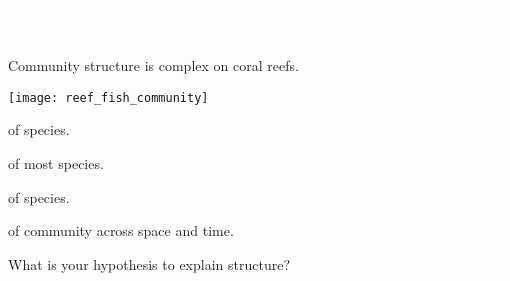 \documentclass[t]{beamer}
\begin{document}
{
\begin{frame}[b]{\textcolor{white}{Community structure.}}
\tiny\textcolor{white}{Elphine Stone Reef, Red Sea, Egypt. Derek Keats, Flickr, Creative Commons.}
\end{frame}
}


\begin{frame}[t]{Community structure is complex on coral reefs.}

\begin{multicols}{2}
	{\centering
	\texttt{[image: reef\_fish\_community]}\par}
\columnbreak
	
	\hangpara{} of species.
	
	\hangpara{} of most species.
	
	\hangpara{} of species.
	
	\hangpara{}
	
	\hangpara{} of community across space and time.
	
	\hangpara What is your hypothesis to explain structure?
\end{multicols}

\end{frame}

{
\begin{frame}[b]{}
\end{frame}
}
\end{document}
